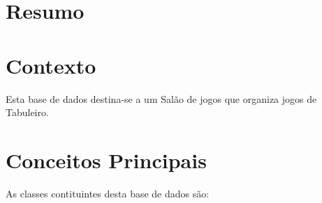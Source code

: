 \documentclass[a4paper]{article}
\begin{document}
\section*{Resumo}





\section{Contexto}
Esta base de dados destina-se a um Salão de jogos que organiza jogos de Tabuleiro.

\section{Conceitos Principais}

As classes contituintes desta base de dados são:
\end{document}
